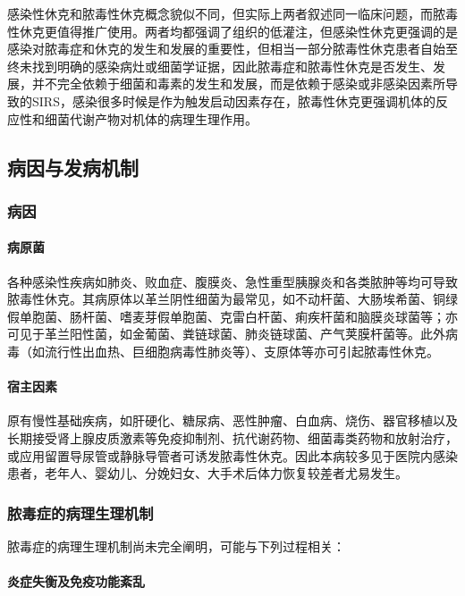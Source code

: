 感染性休克和脓毒性休克概念貌似不同，但实际上两者叙述同一临床问题，而脓毒性休克更值得推广使用。两者均都强调了组织的低灌注，但感染性休克更强调的是感染对脓毒症和休克的发生和发展的重要性，但相当一部分脓毒性休克患者自始至终未找到明确的感染病灶或细菌学证据，因此脓毒症和脓毒性休克是否发生、发展，并不完全依赖于细菌和毒素的发生和发展，而是依赖于感染或非感染因素所导致的SIRS，感染很多时候是作为触发启动因素存在，脓毒性休克更强调机体的反应性和细菌代谢产物对机体的病理生理作用。

\subsection{病因与发病机制}

\subsubsection{病因}

\paragraph{病原菌}

各种感染性疾病如肺炎、败血症、腹膜炎、急性重型胰腺炎和各类脓肿等均可导致脓毒性休克。其病原体以革兰阴性细菌为最常见，如不动杆菌、大肠埃希菌、铜绿假单胞菌、肠杆菌、嗜麦芽假单胞菌、克雷白杆菌、痢疾杆菌和脑膜炎球菌等；亦可见于革兰阳性菌，如金葡菌、粪链球菌、肺炎链球菌、产气荚膜杆菌等。此外病毒（如流行性出血热、巨细胞病毒性肺炎等）、支原体等亦可引起脓毒性休克。

\paragraph{宿主因素}

原有慢性基础疾病，如肝硬化、糖尿病、恶性肿瘤、白血病、烧伤、器官移植以及长期接受肾上腺皮质激素等免疫抑制剂、抗代谢药物、细菌毒类药物和放射治疗，或应用留置导尿管或静脉导管者可诱发脓毒性休克。因此本病较多见于医院内感染患者，老年人、婴幼儿、分娩妇女、大手术后体力恢复较差者尤易发生。

\subsubsection{脓毒症的病理生理机制}

脓毒症的病理生理机制尚未完全阐明，可能与下列过程相关：

\paragraph{炎症失衡及免疫功能紊乱}

